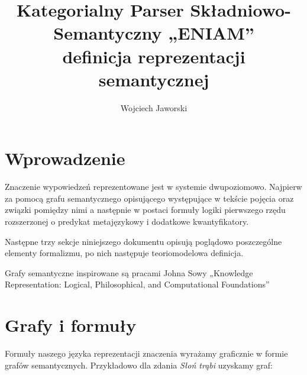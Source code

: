 \documentclass[a4paper,12pt]{article}
\title{Kategorialny Parser Składniowo-Semantyczny „ENIAM”\\{\Large definicja reprezentacji semantycznej}}
\author{Wojciech Jaworski}
\date{}
\begin{document}
\maketitle
 
\section{Wprowadzenie}

Znaczenie wypowiedzeń reprezentowane jest w systemie dwupoziomowo.
Najpierw za pomocą grafu semantycznego opisującego występujące w tekście pojęcia
oraz związki pomiędzy nimi a następnie w postaci formuły logiki pierwszego rzędu
rozszerzonej o predykat metajęzykowy i dodatkowe kwantyfikatory.

Następne trzy sekcje niniejszego dokumentu opisują poglądowo poszczególne elementy formalizmu,
po nich następuje teoriomodelowa definicja.


Grafy semantyczne inspirowane są pracami Johna Sowy „Knowledge Representation:
Logical, Philosophical, and Computational Foundations”


\section{Grafy i formuły}
Formuły naszego języka reprezentacji znaczenia wyrażamy graficznie
w formie grafów semantycznych. %
Przykładowo dla zdania {\it Słoń trąbi} uzyskamy graf: 
\end{document}
